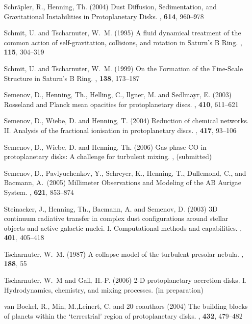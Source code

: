 \begin{ownpubl}
\item
Schr\"apler, R., Henning, Th. (2004) Dust Diffusion, Sedimentation, and
Gravitational Instabilities in Protoplanetary Disks. \apj, \textbf{614}, 960--978

\item
Schmit, U. and Tscharnuter, W.~M. (1995) A fluid dynamical treatment of the
common action of self-gravitation, collisions, and rotation in Saturn's B Ring.
\ica, \textbf{115}, 304--319

\item
Schmit, U. and Tscharnuter, W.~M. (1999) On the Formation of the Fine-Scale
Structure in Saturn's B Ring. \ica, \textbf{138}, 173--187

\item
Semenov, D., Henning, Th., Helling, C., Ilgner, M. and Sedlmayr, E.
(2003) Rosseland and Planck mean opacities for protoplanetary discs. \aap,
\textbf{410}, 611--621

\item
Semenov, D., Wiebe, D. and Henning, T. (2004) Reduction of chemical networks.
II. Analysis of the fractional ionisation in protoplanetary discs. \aap,
\textbf{417}, 93--106

\item
Semenov, D., Wiebe, D. and Henning, Th. (2006) Gas-phase CO in protoplanetary
disks: A challenge for turbulent mixing. \apjl, (submitted)

\item
Semenov, D., Pavlyuchenkov, Y., Schreyer, K., Henning, T., Dullemond, C., and
Bacmann, A.\ (2005) Millimeter Observations and Modeling of the AB Aurigae
System.  \apj, \textbf{621}, 853--874

\item
Steinacker, J., Henning, Th., Bacmann, A. and Semenov, D. (2003) 3D continuum
radiative transfer in complex dust configurations around stellar objects and
active galactic nuclei. I. Computational methods and capabilities. \aap,
\textbf{401}, 405--418

\item
Tscharnuter, W.~M. (1987) A collapse model of the turbulent presolar nebula.
\aap, \textbf{188}, 55

\item
Tscharnuter, W.~M and Gail, H.-P. (2006) 2-D protoplanetary accretion disks. I.
Hydrodynamics, chemistry, and mixing processes. (in preparation)

\item
van Boekel, R., Min, M.,Leinert, C. and  20 coauthors (2004) The building blocks
of planets within the `terrestrial' region of protoplanetary disks. \nat,
\textbf{432}, 479--482



\end{ownpubl}
